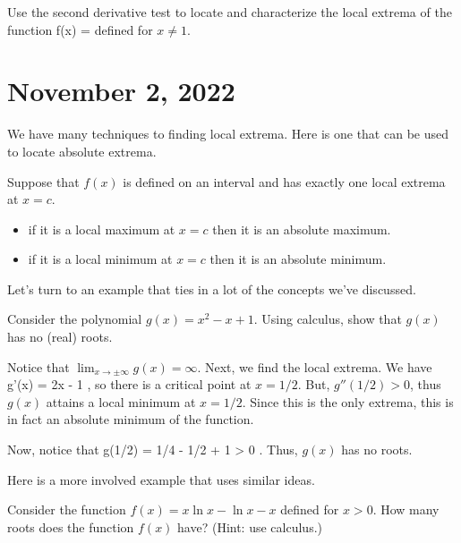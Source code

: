 \documentclass[11pt]{amsart}
\begin{document}
\newpage

\begin{eg}
Use the second derivative test to locate and characterize the local extrema of the function 
\beqn
f(x) = 
\eeqn
defined for $x \ne 1$.
\end{eg}

\newpage

\section*{November 2, 2022}

We have many techniques to finding local extrema. 
Here is one that can be used to locate absolute extrema.

Suppose that $f(x)$ is defined on an interval and has exactly one local extrema at $x = c$. 
\begin{itemize}
\item if it is a local maximum at $x=c$ then it is an absolute maximum. 
\item if it is a local minimum at $x=c$ then it is an absolute minimum. 
\end{itemize} 

\vspace{3 cm}

Let's turn to an example that ties in a lot of the concepts we've discussed.

\begin{eg}
Consider the polynomial $g(x) = x^2 - x + 1$. 
Using calculus, show that $g(x)$ has no (real) roots. 
\end{eg} 

\newpage

Notice that $\lim_{x \to \pm \infty} g(x) = \infty$. 
Next, we find the local extrema. 
We have
\beqn
g'(x) = 2x - 1 ,
\eeqn
so there is a critical point at $x = 1/2$. 
But, $g''(1/2) > 0$, thus $g(x)$ attains a local minimum at $x = 1/2$.
Since this is the only extrema, this is in fact an absolute minimum of the function. 

Now, notice that 
\beqn
g(1/2) = 1/4 - 1/2 + 1 > 0 .
\eeqn
Thus, $g(x)$ has no roots. 

\vspace{1cm}

Here is a more involved example that uses similar ideas.

\begin{eg} Consider the function $f(x) = x \ln x - \ln x - x$ defined for $x > 0$. 
How many roots does the function $f(x)$ have? 
(Hint: use calculus.)
\end{eg} 
\end{document}
